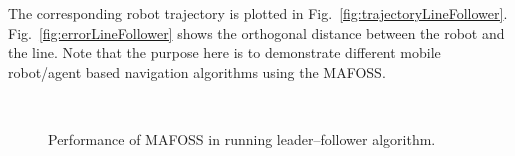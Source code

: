 %
The corresponding robot trajectory is plotted in Fig.~\ref{fig:trajectoryLineFollower}. Fig.~\ref{fig:errorLineFollower} shows the orthogonal distance between the robot and the line. Note that the purpose here is to demonstrate different mobile robot/agent based navigation algorithms using the MAFOSS. 
\begin{figure}
    \centering
    \\
    \caption{Performance of MAFOSS in running leader--follower algorithm.}
    \label{fig:performanceLineFollower}
\end{figure}


